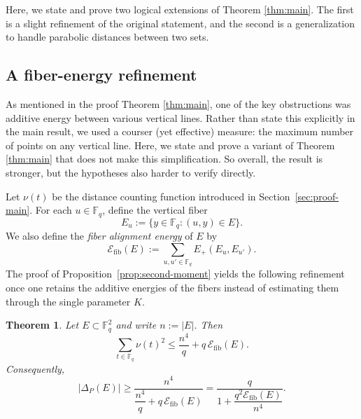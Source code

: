 \documentclass{article}
\newtheorem{theorem}{Theorem}
\newcommand{\F}{\mathbb{F}}
\newcommand{\1}{\mathbf{1}}
\begin{document}
Here, we state and prove two logical extensions of Theorem \ref{thm:main}. The first is a slight refinement of the original statement, and the second is a generalization to handle parabolic distances between two sets.

\subsection{A fiber-energy refinement}\label{sec:fiber-energy}
As mentioned in the proof Theorem \ref{thm:main}, one of the key obstructions was additive energy between various vertical lines. Rather than state this explicitly in the main result, we used a courser (yet effective) measure: the maximum number of points on any vertical line. Here, we state and prove a variant of Theorem \ref{thm:main} that does not make this simplification. So overall, the result is stronger, but the hypotheses also harder to verify directly.

Let $\nu(t)$ be the distance counting function introduced in Section~\ref{sec:proof-main}. For each $u\in \F_q$, define the vertical fiber
\begin{equation}\label{eq:def-Eu}
E_u:=\{y\in\F_q:(u,y)\in E\}.
\end{equation}
We also define the \emph{fiber alignment energy} of $E$ by
\begin{equation}\label{eq:def-fiber-energy}
\mathcal{E}_{\mathrm{fib}}(E)
:=
\sum_{u,u'\in\F_q}E_+(E_u,E_{u'}).
\end{equation}
The proof of Proposition~\ref{prop:second-moment} yields the following refinement once one retains the additive energies of the fibers instead of estimating them through the single parameter $K$.

\begin{theorem}\label{thm:fiber-energy}
Let $E\subset \F_q^2$ and write $n:=|E|$. Then
\[
\sum_{t\in\F_q}\nu(t)^2
\le
\frac{n^4}{q}+q\,\mathcal{E}_{\mathrm{fib}}(E).
\]
Consequently,
\[
|\Delta_P(E)|
\ge
\frac{n^4}{\dfrac{n^4}{q}+q\,\mathcal{E}_{\mathrm{fib}}(E)}
=
\frac{q}{1+\dfrac{q^2\mathcal{E}_{\mathrm{fib}}(E)}{n^4}}.
\]
\end{theorem}
\end{document}
